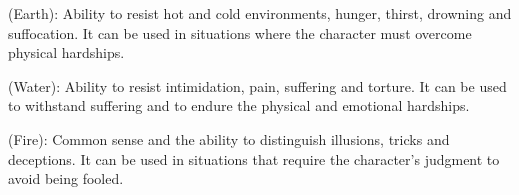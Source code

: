 \begin{multicols}{2}
\begin{ffcolpage}
\end{ffcolpage} \pw \begin{ffcolpage}
 (Earth): Ability to resist hot and cold environments, hunger, thirst, drowning and suffocation. It can be used in situations where the character must overcome physical hardships.
\end{ffcolpage} \pw \begin{ffcolpage}
 (Water): Ability to resist intimidation, pain, suffering and torture. It can be used to withstand suffering and to endure the physical and emotional hardships.
\end{ffcolpage} \pw \begin{ffcolpage}
 (Fire): Common sense and the ability to distinguish illusions, tricks and deceptions. It can be used in situations that require the character’s judgment to avoid being fooled.
\end{ffcolpage}
\end{multicols}

